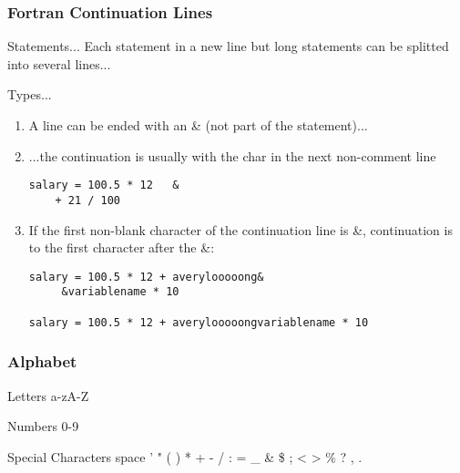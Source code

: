 \documentclass[xcolor=dvipsnames,dvip,notes=show,table]{beamer}
\begin{document}
\begin{frame}[fragile]
\frametitle{Fortran Continuation Lines}

\begin{exampleblock}{Statements...}
Each statement in a new line but long statements can be splitted into several lines...
\end{exampleblock}

\tiny
\begin{block}{Types...}
\begin{enumerate}
 \item A line can be ended with an \& (not part of the statement)...
 \item ...the continuation is usually with the char in the next non-comment line

 \begin{lstlisting}
salary = 100.5 * 12   &
    + 21 / 100
 \end{lstlisting}

 \item If the first non-blank character of the continuation line is \&, continuation is to the first character after the \&:
  \begin{lstlisting}
salary = 100.5 * 12 + averylooooong&
     &variablename * 10
     
salary = 100.5 * 12 + averylooooongvariablename * 10
\end{lstlisting}
  
\end{enumerate}

\end{block}


\end{frame}
% 

\begin{frame}[fragile]
 \frametitle{Alphabet}
 \begin{block}{Letters}
  a-zA-Z
 \end{block}
 
 \begin{exampleblock}{Numbers}
 0-9
 \end{exampleblock}
% 
% 
 \begin{alertblock}{Special Characters}
 space ' " ( ) * + - / : = \_ \! \& \$ ; < > \% ? , .
 \end{alertblock}
 
\end{frame}
\end{document}
